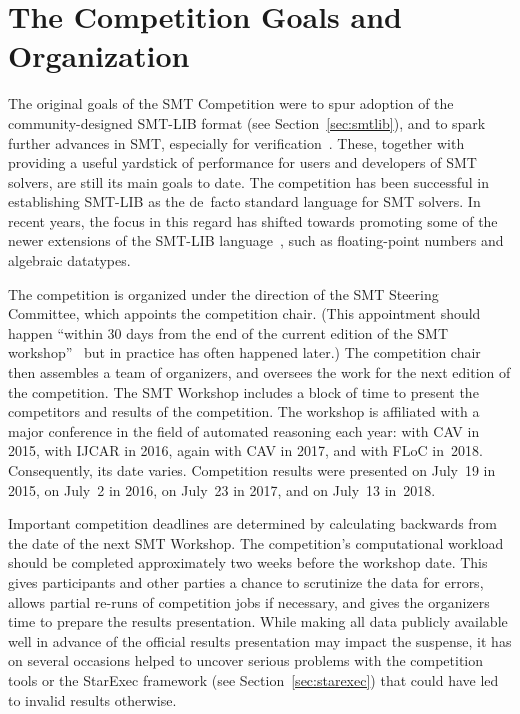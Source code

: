 \documentclass[twoside,11pt]{article}
\begin{document}

\section{The Competition Goals and Organization}
\label{sec:goals}

The original goals of the SMT Competition were to spur adoption of the
community-designed SMT-LIB format (see Section~\ref{sec:smtlib}), and
to spark further advances in SMT, especially for
verification~\cite{BdMS05}.  These, together with providing a useful
yardstick of performance for users and developers of SMT solvers, are
still its main goals to date.  The competition has been successful in
establishing SMT-LIB as the de~facto standard language for SMT
solvers.  In recent years, the focus in this regard has shifted
towards promoting some of the newer extensions of the SMT-LIB
language~\cite{BarFT-RR-17}, such as floating-point numbers and
algebraic datatypes.

The competition is organized under the direction of the SMT Steering
Committee, which appoints the competition chair.  (This appointment
should happen ``within 30 days from the end of the current edition of
the SMT workshop''~\cite{smt-bylaws} but in practice has often
happened later.)  The competition chair then assembles a team of
organizers, and oversees the work for the next edition of the
competition.
%
The SMT Workshop includes a block of time to present the competitors
and results of the competition.  The workshop is affiliated with a
major conference in the field of automated reasoning each year: with
CAV in 2015, with IJCAR in 2016, again with CAV in 2017, and with FLoC
in~2018.  Consequently, its date varies.  Competition results were
presented on July~19 in 2015, on July~2 in 2016, on July~23 in 2017,
and on July~13 in~2018.

Important competition deadlines are determined by calculating
backwards from the date of the next SMT Workshop.  The competition's
computational workload should be completed approximately two weeks
before the workshop date.  This gives participants and other parties a
chance to scrutinize the data for errors, allows partial re-runs of
competition jobs if necessary, and gives the organizers time to
prepare the results presentation.  While making all data publicly
available well in advance of the official results presentation may
impact the suspense, it has on several occasions helped to uncover
serious problems with the competition tools or the StarExec framework
(see Section~\ref{sec:starexec}) that could have led to invalid
results otherwise.
\end{document}
